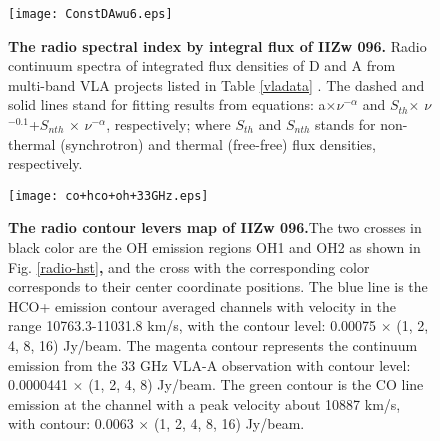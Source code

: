 \documentclass[]{aa} %
\begin{document}
\begin{figure*}
   \centering
 \texttt{[image: ConstDAwu6.eps]}
      \caption{\textbf{The radio spectral index by integral flux of IIZw 096.} Radio continuum spectra of integrated flux densities of D and A from multi-band VLA projects listed in Table \ref{vladata} . The dashed and solid lines stand for fitting results from  equations: a$\times$$\nu$$^{-\alpha}$ and $S_{th} $$\times$ $\nu$$^{-0.1}$+$S_{nth}$ $\times$ $\nu$$^{-\alpha}$, respectively; where $S_{th} $ and $S_{nth}$ stands for non-thermal (synchrotron) and thermal (free-free) flux densities, respectively. }

    \label{ConstantABD}%
\end{figure*}
 \begin{figure}
   \centering
\texttt{[image: co+hco+oh+33GHz.eps]}
      \caption{\textbf{The radio contour levers map of IIZw 096.}The two crosses in black color are the OH emission regions OH1 and OH2 as shown in Fig. \ref{radio-hst}\textbf{,} and the cross with the corresponding color corresponds to their center coordinate positions. The blue line is the HCO+ emission contour averaged channels with velocity in the range 10763.3-11031.8 km/s, with the contour level: 0.00075 $\times$ (1, 2, 4, 8, 16) Jy/beam. The magenta contour represents the continuum emission from the 33 GHz VLA-A observation with contour level: 0.0000441 $\times$ (1, 2, 4, 8) Jy/beam. The green contour is the CO line emission at the channel with a peak velocity about 10887 km/s, with contour: 0.0063 $\times$ (1, 2, 4, 8, 16) Jy/beam.}
    \label{cohcooh33}%
\end{figure}
\end{document}
